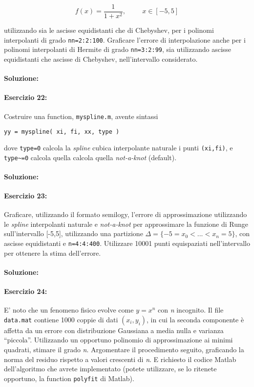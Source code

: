 \documentclass[12pt]{article}
\begin{document}
\begin{equation}
    f(x)=\frac{1}{1+x^{2}}, \hspace{1cm} x \in [-5,5]
\end{equation}

utilizzando sia le ascisse equidistanti che di Chebyshev, per i polinomi interpolanti di grado \texttt{nn=2:2:100}.
Graficare l'errore di interpolazione anche per i polinomi interpolanti di Hermite di grado \texttt{nn=3:2:99},
sia utilizzando ascisse equidistanti che ascisse di Chebyshev, nell'intervallo considerato.

\paragraph{Soluzione:}


\paragraph{Esercizio 22:}
Costruire una function, \texttt{myspline.m}, avente sintassi
\begin{center}
\texttt{yy = myspline( xi, fi, xx, type )}
\end{center}
dove \texttt{type=0} calcola la \emph{spline} cubica interpolante naturale i punti \texttt{(xi,fi)}, e \texttt{type\textasciitilde=0} calcola quella calcola quella
\emph{not-a-knot} (default).
\paragraph{Soluzione:}


\paragraph{Esercizio 23:}
Graficare, utilizzando il formato semilogy, l'errore di approssimazione utilizzando le
\emph{spline} interpolanti naturale e \emph{not-a-knot} per approssimare la funzione di Runge sull'intervallo [-5,5],
utilizzando una partizione \(\Delta = \{-5=x_0 <...<x_n=5\}\), con ascisse equidistanti e \texttt{n=4:4:400}.
Utilizzare 10001 punti equispaziati nell'intervallo \text{[-5, 5]} per ottenere la stima dell'errore.

\paragraph{Soluzione:}


\paragraph{Esercizio 24:}
E' noto che un fenomeno fisico evolve come \(y = x^{n}\) con \emph{n} incognito. 
Il file \texttt{data.mat} contiene 1000 coppie di dati \((x_{i},y_{i})\), in cui la seconda componente è affetta da un errore con distribuzione Gaussiana a media nulla e varianza “piccola”. Utilizzando un opportuno polinomio
di approssimazione ai minimi quadrati, stimare il grado \emph{n}. Argomentare il procedimento seguito,
graficando la norma del residuo rispetto a valori crescenti di \emph{n}. E richiesto il codice Matlab dell'algoritmo 
che avrete implementato (potete utilizzare, se lo ritenete opportuno, la function \texttt{polyfit}
di Matlab).
\end{document}
